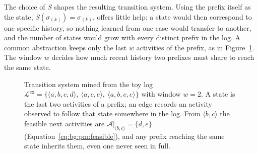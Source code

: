     The choice of $S$ shapes the resulting transition system. Using the
    prefix itself as the state, $S(\sigma_{(k)}) = \sigma_{(k)}$, offers
    little help: a state would then correspond to one specific history, so
    nothing learned from one case would transfer to another, and the number
    of states would grow with every distinct prefix in the log. A common
    abstraction keeps only the last $w$ activities of the prefix, as in
    Figure~\ref{fig:bg:pm:ts}. The window $w$ decides how much recent history
    two prefixes must share to reach the same state.

    \begin{figure}[t]
      \centering
      \caption{Transition system mined from the toy log
        $\mathcal{L}^{\mathrm{ex}} = \{\langle a,b,c,d\rangle,\ \langle a,c,e\rangle,\
        \langle a,b,c,e\rangle\}$ with window $w = 2$. A state is the last two
        activities of a prefix; an edge records an activity observed to follow that
        state somewhere in the log. From $\langle b,c\rangle$ the feasible next
        activities are $\mathcal{A}|_{\langle b,c\rangle} = \{d, e\}$
        (Equation~\eqref{eq:bg:pm:feasible}), and any prefix reaching the same state
        inherits them, even one never seen in full.}
      \label{fig:bg:pm:ts}
    \end{figure}

